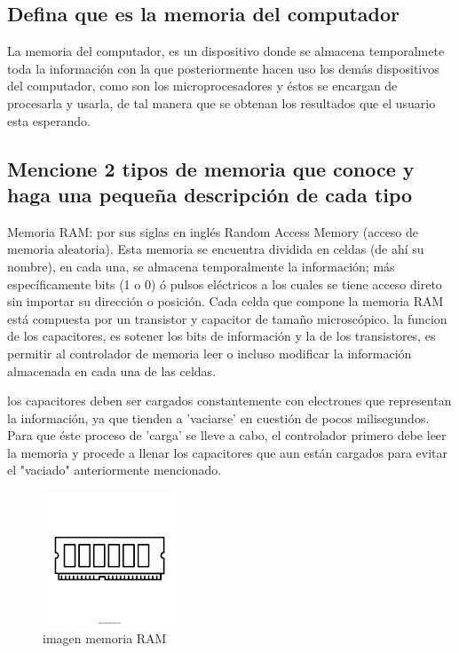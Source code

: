 \documentclass{article}
\begin{document}
\subsection{Defina que es la memoria del computador}
%
La memoria del computador, es un dispositivo donde se almacena temporalmete toda la información con la que posteriormente hacen uso los demás dispositivos del computador, como son los microprocesadores y éstos se encargan de procesarla y usarla, de tal manera que se obtenan los resultados que el usuario esta esperando.


\subsection{Mencione 2 tipos de memoria que conoce y haga una pequeña descripción de cada tipo}
%
Memoria RAM: por sus siglas en inglés Random Access Memory (acceso de memoria aleatoria). Esta memoria se encuentra dividida en celdas (de ahí su nombre), en cada una, se almacena temporalmente la información; más específicamente bits (1 o 0) ó pulsos eléctricos a los cuales se tiene acceso direto sin importar su dirección o posición.
Cada celda que compone la memoria RAM está compuesta por un transistor y capacitor de tamaño microscópico.
la funcion de los capacitores, es sotener los bits de información y la de los transistores, es permitir al controlador de memoria leer o incluso modificar la información almacenada en cada una de las celdas.

los capacitores deben ser cargados constantemente con electrones que representan la información, ya que tienden a 'vaciarse' en cuestión de pocos milisegundos. Para que éste proceso de 'carga' se lleve a cabo, el controlador primero debe leer la memoria y procede a llenar los capacitores que aun están cargados para evitar el "vaciado" anteriormente mencionado.\\
%
\begin{figure}[h]
\includegraphics[width=4cm]{memoriaRAM.png}
\centering
\caption{imagen memoria RAM}
\label{fig:memoriaRAM}
\end{figure}
\end{document}
